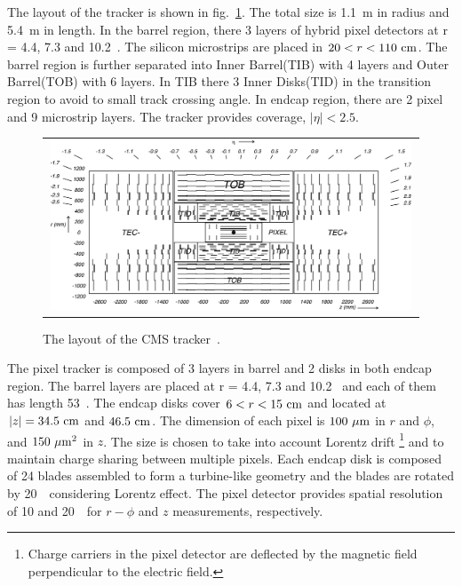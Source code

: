 The layout of the tracker is shown in fig.~\ref{fig:trackerlayout}. 
The total size is 1.1~m in radius and 5.4~m in length. 
In the barrel region, there 3 layers of hybrid pixel detectors
at r = 4.4, 7.3 and 10.2~\cm. The silicon microstrips are 
placed in $20<r<110~\mathrm{cm}$. The barrel region is further separated 
into Inner Barrel(TIB) with 4 layers and Outer Barrel(TOB) with 6 layers. 
In TIB there 3 Inner Disks(TID) in the transition region 
to avoid to small track crossing angle. 
In endcap region, there are 2 pixel and 9 microstrip layers. 
The tracker provides coverage, $|\eta|<2.5$.
%
\begin{figure}[htp] 
\centering 
\begin{tabular}{c} 
\includegraphics[width=0.99\textwidth]{figures/trackerlayout.jpeg} 
\end{tabular} 
\caption{The layout of the CMS tracker~\cite{Anghel2009277}.} 
\label{fig:trackerlayout} 
\end{figure} 

The pixel tracker is composed of 3 layers in barrel and 2 disks in both 
endcap region. The barrel layers are placed at r = 4.4, 7.3 and 10.2~\cm
and each of them has length 53~\cm. The endcap disks cover $6<r<15~\mathrm{cm}$
and located at $|z|=34.5~\mathrm{cm}$ and $46.5~\mathrm{cm}$. The dimension of each 
pixel is $100~\mu\mathrm{m}$ in $r$ and $\phi$, and $150~\mu\mathrm{m}^2$ in $z$.  
The size is chosen to take into account Lorentz drift  
\footnote{
Charge carriers in the pixel detector are deflected by the magnetic field perpendicular 
to the electric field. }
and to maintain charge sharing between multiple pixels. 
Each endcap disk is composed of 24 blades assembled to form 
a turbine-like geometry and the blades are rotated by 20~\dg\
considering Lorentz effect. The pixel detector provides 
spatial resolution of 10 and 20~\um\ for $r-\phi$ and $z$ measurements, 
respectively.

